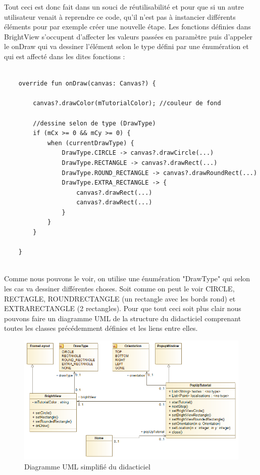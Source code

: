 Tout ceci est donc fait dans un souci de réutilisabilité et pour que si un autre utilisateur venait à reprendre ce code, qu'il n'est pas à instancier différents éléments pour par exemple créer une nouvelle étape. Les fonctions définies dans BrightView s'occupent d'affecter les valeurs passées en paramètre puis d'appeler le onDraw qui va dessiner l'élément selon le type défini par une énumération et qui est affecté dans les dites fonctions : 

\begin{lstlisting}[frame=single]  % Start your code-block
    
    override fun onDraw(canvas: Canvas?) {
        
        canvas?.drawColor(mTutorialColor); //couleur de fond
        
        //dessine selon de type (DrawType)
        if (mCx >= 0 && mCy >= 0) {
            when (currentDrawType) {
                DrawType.CIRCLE -> canvas?.drawCircle(...)
                DrawType.RECTANGLE -> canvas?.drawRect(...)
                DrawType.ROUND_RECTANGLE -> canvas?.drawRoundRect(...)
                DrawType.EXTRA_RECTANGLE -> {
                    canvas?.drawRect(...)
                    canvas?.drawRect(...)
                }
            }
        }

    }
    
\end{lstlisting}

Comme nous pouvons le voir, on utilise une énumération "DrawType" qui selon les cas va dessiner différentes choses. Soit comme on peut le voir CIRCLE, RECTAGLE, ROUNDRECTANGLE (un rectangle avec les bords rond) et EXTRARECTANGLE (2  rectangles).
Pour que tout ceci soit plus clair nous pouvons faire un diagramme UML de la structure du didacticiel comprenant toutes les classes précédemment définies et les liens entre elles.


\begin{figure}[!htp]
  \centering
  \includegraphics[width=115mm,scale=0.5]{images/diagramme.png}
  \caption{Diagramme UML simplifié du didacticiel}
  \label{fig:boat1}
\end{figure}

